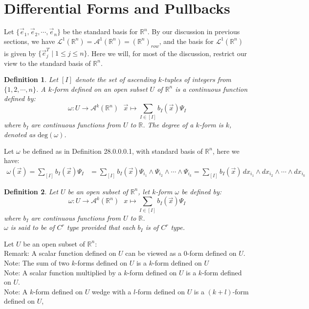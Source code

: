 \documentclass[11pt,oneside]{book}
\theoremstyle{break}
\theoremstyle{break}
\newtheorem{defn}{Definition}[corL]
\newcommand{\R}{\mathbb{R}}
\newcommand{\Lt}{\mathcal{L}}
\newcommand{\A}{\mathcal{A}}
\newcommand{\note}{\color{red}Note: \color{black}}
\newcommand{\remark}{\color{blue}Remark: \color{black}}
\begin{document}
\newpage
\section[Differential Forms and Pullbacks]{\color{red}Differential Forms and Pullbacks\color{black}}
Let $\{\vec{e}_1,\vec{e}_2,\cdots,\vec{e}_n\}$ be the standard basis for $\R^n$. By our discussion in previous sections, we have $\Lt^1(\R^n) = \A^1(\R^n) = (\R^n)_{row}$, and the basis for $\Lt^1(\R^n)$ is given by $\{\vec{e}^T_j \mid 1 \leq j \leq n\}$. Here we will, for most of the discussion, restrict our view to the standard basis of $\R^n$. 

\begin{defn}
Let $[I]$ denote the set of ascending $k$-tuples of integers from $\{1,2,\cdots, n\}$. A $k$-form defined on an open subset $U$ of $\R^n$ is a continuous function defined by: 
$$\omega:U \to \A^k(\R^n) \ \ \ \vec{x}\mapsto \sum_{I \in [I]} b_I(\vec{x}) \Psi_I$$
where $b_I$ are continuous functions from $U$ to $\R$. The degree of a $k$-form is $k$, denoted as $\text{deg}(\omega)$. 
\end{defn}

Let $\omega$ be defined as in Definition 28.0.0.0.1, with standard basis of $\R^n$, here we have:
\begin{align*}
 \omega(\vec{x}) = \sum_{[I]} b_I(\vec{x}) \Psi_I 
 &= \sum_{[I]} b_I(\vec{x}) \Psi_{i_1}\wedge \Psi_{i_2}\wedge \cdots \wedge \Psi_{i_k}= \sum_{[I]} b_I(\vec{x})\, dx_{i_1}\wedge dx_{i_2}\wedge \cdots \wedge dx_{i_k} \tag{W}
\end{align*}

\begin{defn}
Let $U$ be an open subset of $\R^n$, let $k$-form $\omega$ be defined by:
$$\omega :U \to \A^k(\R^n) \ \ \ x\mapsto \sum_{I \in [I]} b_I(\vec{x}) \Psi_I $$ 
where $b_I$ are continuous functions from $U$ to $\R$. \\
$\omega$ is said to be of $C^r$ type provided that each $b_I$ is of $C^r$ type. 
\end{defn}

Let $U$ be an open subset of $\R^n$:\\
\remark A scalar function defined on $U$ can be viewed as a $0$-form defined on $U$. \\
\note The sum of two $k$-forms defined on $U$ is a $k$-form defined on $U$\\
\note A scalar function multiplied by a $k$-form defined on $U$ is a $k$-form defined on $U$.\\
\note A $k$-form defined on $U$ wedge with a $l$-form defined on $U$ is a $(k+l)$-form defined on $U$,\\
\end{document}
